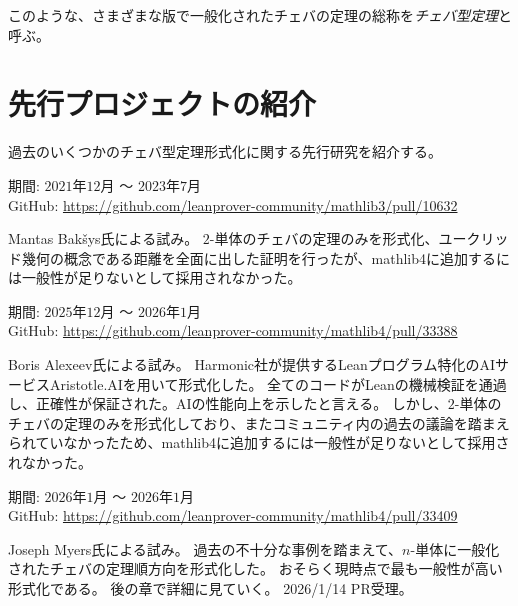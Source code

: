 \documentclass[a4paper,12pt]{bxjsbook}
\newlength{\customindent}
\newenvironment{body}{
  \par
  \begingroup
  \setlength{\leftskip}{\customindent}
  \setlength{\rightskip}{0pt}
  \setlength{\parindent}{1em}
  \setlength{\displayindent}{\customindent}
  \setlength{\displaywidth}{\dimexpr\linewidth-\customindent\relax}
}{
  \par
  \endgroup
}
\theoremstyle{theorem}
\begin{document}
\begin{body}
\begin{bodydescription}
        \end{bodydescription}

        \indent このような、さまざまな版で一般化されたチェバの定理の総称を\emph{チェバ型定理}と呼ぶ。
    \end{body}

    \section{先行プロジェクトの紹介}
    \begin{body}
        \indent 過去のいくつかのチェバ型定理形式化に関する先行研究を紹介する。

        \begin{bodydescription}
            \item[\hspace*{1.5em}・Lean3時代の形式化]
            期間: $2021$年$12$月 〜 $2023$年$7$月\\
            GitHub: \url{https://github.com/leanprover-community/mathlib3/pull/10632} \cite{mathlib3_ceva}

            Mantas Bakšys氏による試み。
            $2$-単体のチェバの定理のみを形式化、ユークリッド幾何の概念である距離を全面に出した証明を行ったが、mathlib4に追加するには一般性が足りないとして採用されなかった。

            \item[\hspace*{1.5em}・Aristotle.AI（Harmonic社）を用いた形式化]
            期間: $2025$年$12$月 〜 $2026$年$1$月\\
            GitHub: \url{https://github.com/leanprover-community/mathlib4/pull/33388} \cite{mathlib4_ceva_alexeev}

            Boris Alexeev氏による試み。
            Harmonic社が提供するLeanプログラム特化のAIサービスAristotle.AIを用いて形式化した。
            全てのコードがLeanの機械検証を通過し、正確性が保証された。AIの性能向上を示したと言える。
            しかし、$2$-単体のチェバの定理のみを形式化しており、またコミュニティ内の過去の議論を踏まえられていなかったため、mathlib4に追加するには一般性が足りないとして採用されなかった。

            \item[\hspace*{1.5em}・$n$-単体で汎用一般化された初の形式化]
            期間: $2026$年$1$月 〜 $2026$年$1$月\\
            GitHub: \url{https://github.com/leanprover-community/mathlib4/pull/33409} \cite{mathlib4_ceva_myers}

            Joseph Myers氏による試み。
            過去の不十分な事例を踏まえて、$n$-単体に一般化されたチェバの定理順方向を形式化した。
            おそらく現時点で最も一般性が高い形式化である。
            後の章で詳細に見ていく。
            2026/1/14 PR受理。
        \end{bodydescription}

    \end{body}
\end{document}
